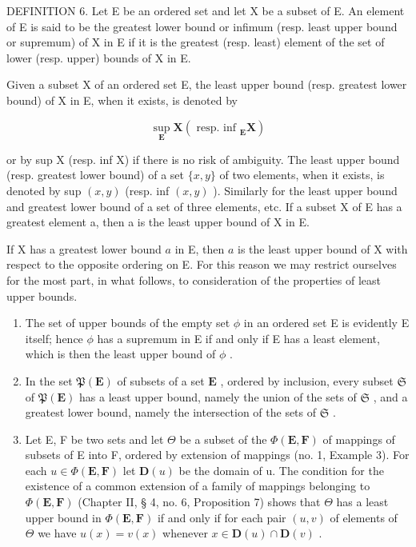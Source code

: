 DEFINITION 6. Let E be an ordered set and let X be a subset of E. An element of E is said to be the greatest lower bound or infimum (resp. least upper bound or supremum) of X in E if it is the greatest (resp. least) element of the set of lower (resp. upper) bounds of X in E.

Given a subset X of an ordered set E, the least upper bound (resp. greatest lower bound) of X in E, when it exists, is denoted by

\[
\sup _ {\mathbf {E}} \mathbf {X} (\text { resp.   inf } _ {\mathbf {E}} \mathbf {X})
\]

or by sup X (resp. inf X) if there is no risk of ambiguity. The least upper bound (resp. greatest lower bound) of a set \(\{x, y\}\) of two elements, when it exists, is denoted by sup \((x, y)\) (resp. inf \((x, y)\) ). Similarly for the least upper bound and greatest lower bound of a set of three elements, etc. If a subset X of E has a greatest element a, then a is the least upper bound of X in E.

If X has a greatest lower bound \(a\) in E, then \(a\) is the least upper bound of X with respect to the opposite ordering on E. For this reason we may restrict ourselves for the most part, in what follows, to consideration of the properties of least upper bounds.


\begin{enumerate}
\def\labelenumi{(\arabic{enumi})}
\item
  The set of upper bounds of the empty set \(\phi\) in an ordered set E is evidently E itself; hence \(\phi\) has a supremum in E if and only if E has a least element, which is then the least upper bound of \(\phi\) .
\item
  In the set \(\mathfrak{P}(\mathbf{E})\) of subsets of a set \(\mathbf{E}\) , ordered by inclusion, every subset \(\mathfrak{S}\) of \(\mathfrak{P}(\mathbf{E})\) has a least upper bound, namely the union of the sets of \(\mathfrak{S}\) , and a greatest lower bound, namely the intersection of the sets of \(\mathfrak{S}\) .
\item
  Let E, F be two sets and let \(\Theta\) be a subset of the \(\Phi(\mathbf{E}, \mathbf{F})\) of mappings of subsets of E into F, ordered by extension of mappings (no. 1, Example 3). For each \(u \in \Phi(\mathbf{E}, \mathbf{F})\) let \(\mathbf{D}(u)\) be the domain of u. The condition for the existence of a common extension of a family of mappings belonging to \(\Phi(\mathbf{E}, \mathbf{F})\) (Chapter II, § 4, no. 6, Proposition 7) shows that \(\Theta\) has a least upper bound in \(\Phi(\mathbf{E}, \mathbf{F})\) if and only if for each pair \((u, v)\) of elements of \(\Theta\) we have \(u(x) = v(x)\) whenever \(x \in \mathbf{D}(u) \cap \mathbf{D}(v)\) .
\end{enumerate}

